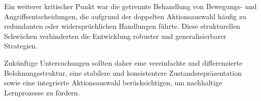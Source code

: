 Ein weiterer kritischer Punkt war die getrennte Behandlung von Bewegungs- und Angriffsentscheidungen, die aufgrund der doppelten Aktionsauswahl häufig zu redundanten oder widersprüchlichen Handlungen führte. Diese strukturellen Schwächen verhinderten die Entwicklung robuster und generalisierbarer Strategien.

Zukünftige Untersuchungen sollten daher eine vereinfachte und differenzierte Belohnungsstruktur, eine stabilere und konsistentere Zustandsrepräsentation sowie eine integrierte Aktionsauswahl berücksichtigen, um nachhaltige Lernprozesse zu fördern.
